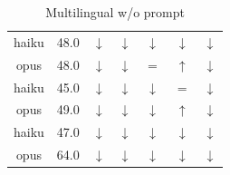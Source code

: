 \documentclass{article}
\newcommand{\bluearrow}[1]{\textcolor{blue}{#1}}
\begin{document}
\begin{table}
\begin{tabular}{ccccccc}
         \hline
                  \hline
                           \hline
haiku & 48.0 & $\downarrow$ & $\downarrow$ & $\downarrow$ & $\downarrow$ & $\downarrow$ \\
opus & 48.0 & $\downarrow$ & $\downarrow$ & $=$ & $\uparrow$ & $\downarrow$ \\
         \hline
haiku & 45.0 & $\downarrow$ & $\downarrow$ & $\downarrow$ & $=$ & $\downarrow$ \\
opus & 49.0 & $\downarrow$ & $\downarrow$ & $\downarrow$ & $\uparrow$ & $\downarrow$ \\
         \hline
haiku & 47.0 & $\downarrow$ & $\downarrow$ & $\downarrow$ & $\downarrow$ & $\downarrow$ \\
opus & 64.0 & $\downarrow$ & $\downarrow$ & $\downarrow$ & $\downarrow$ & $\downarrow$ \\
    \end{tabular}
    \caption{Multilingual w/o prompt}
    \label{tab:my_label}
\end{table}
\end{document}
